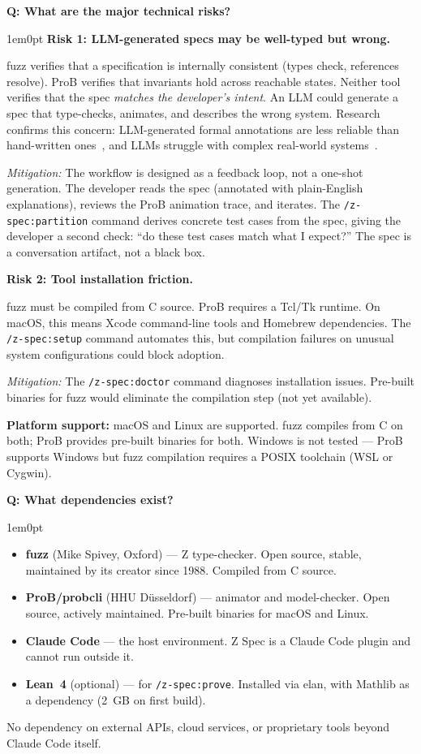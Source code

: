 \documentclass[11pt,letterpaper]{article}
\newcounter{faqnum}
\newenvironment{faqpair}[1]{%
  \needspace{4\baselineskip}%
  \vspace{0.5em}%
  \refstepcounter{faqnum}%
  \noindent\textbf{\color{SectionBlue}Q\thefaqnum: #1}\par\nopagebreak[4]%
  \vspace{0.2em}%
  \begin{adjustwidth}{1em}{0pt}%
  \setlength{\parindent}{0pt}%
}{%
  \end{adjustwidth}%
  \vspace{0.5em}%
}
\begin{document}
\begin{faqpair}{What are the major technical risks?}\label{faq:tech-risks}
\textbf{Risk 1: LLM-generated specs may be well-typed but wrong.}

fuzz verifies that a specification is internally consistent (types check, references resolve). ProB verifies that invariants hold across reachable states. Neither tool verifies that the spec \emph{matches the developer's intent}. An LLM could generate a spec that type-checks, animates, and describes the wrong system. Research confirms this concern: LLM-generated formal annotations are less reliable than hand-written ones~\cite{beg2026acsl}, and LLMs struggle with complex real-world systems~\cite{cheng2025sysmobench}.

\emph{Mitigation:} The workflow is designed as a feedback loop, not a one-shot generation. The developer reads the spec (annotated with plain-English explanations), reviews the ProB animation trace, and iterates. The \texttt{/z-spec:partition} command derives concrete test cases from the spec, giving the developer a second check: ``do these test cases match what I expect?'' The spec is a conversation artifact, not a black box.

\textbf{Risk 2: Tool installation friction.}

fuzz must be compiled from C source. ProB requires a Tcl/Tk runtime. On macOS, this means Xcode command-line tools and Homebrew dependencies. The \texttt{/z-spec:setup} command automates this, but compilation failures on unusual system configurations could block adoption.

\emph{Mitigation:} The \texttt{/z-spec:doctor} command diagnoses installation issues. Pre-built binaries for fuzz would eliminate the compilation step (not yet available).

\textbf{Platform support:} macOS and Linux are supported. fuzz compiles from C on both; ProB provides pre-built binaries for both. Windows is not tested --- ProB supports Windows but fuzz compilation requires a POSIX toolchain (WSL or Cygwin).
\end{faqpair}

\begin{faqpair}{What dependencies exist?}
\begin{itemize}[nosep]
\item \textbf{fuzz} (Mike Spivey, Oxford) --- Z type-checker. Open source, stable, maintained by its creator since 1988. Compiled from C source.
\item \textbf{ProB/probcli} (HHU D\"usseldorf) --- animator and model-checker. Open source, actively maintained. Pre-built binaries for macOS and Linux.
\item \textbf{Claude Code} --- the host environment. Z Spec is a Claude Code plugin and cannot run outside it.
\item \textbf{Lean~4} (optional) --- for \texttt{/z-spec:prove}. Installed via elan, with Mathlib as a dependency (2~GB on first build).
\end{itemize}
No dependency on external APIs, cloud services, or proprietary tools beyond Claude Code itself.
\end{faqpair}
\end{document}
